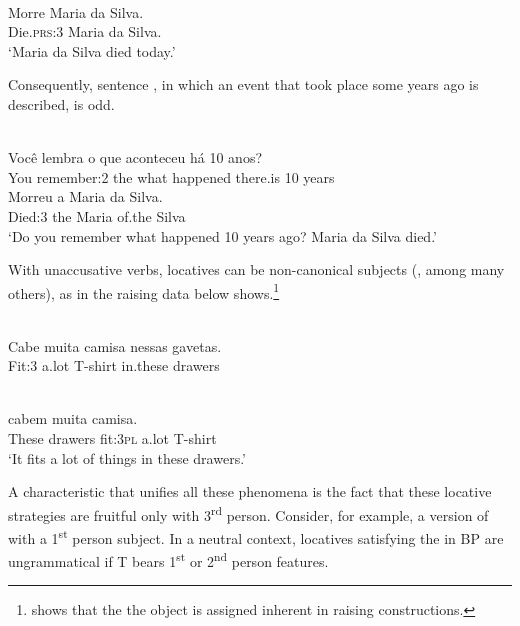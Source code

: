 \documentclass[output=paper]{LSP/langsci}
\begin{document}
\ea\label{ex:24.alexiadou}
\\
\gll Morre Maria da Silva.\\
 Die.\textsc{prs}:3 Maria da Silva.\\
\glt ‘Maria da Silva died today.’
\z

Consequently, sentence , in which an event that took place some years ago is described, is odd.


\ea\label{ex:25.alexiadou}
\\
\gll {} Você lembra o que aconteceu há 10 anos?\\
 {} You remember:2 the what happened there.is 10 years\\

\gll {\upshape *}  Morreu a Maria da Silva.\\
     {} Died:3 the Maria of.the Silva\\

\glt ‘Do you remember what happened 10 years ago? Maria da Silva died.’
\z


With unaccusative verbs, locatives can be non-canonical subjects (\citealt{Pontes1987,Galves2001,Lunguinho2006,Rodrigues2010}, among many others), as in the  raising data below shows.\footnote{\citet{Nunes2015} shows that the the object is assigned inherent  in  raising constructions.}


\ea\label{ex:26.alexiadou}
\\
\gll Cabe muita camisa nessas gavetas.\\
 Fit:3 a.lot T-shirt in.these drawers\\
\glt
\z

\ea\label{ex:27.alexiadou}
\\
 cabem muita camisa.\\
 These drawers fit:3\textsc{pl} a.lot T-shirt\\
\glt ‘It fits a lot of things in these drawers.’
\z


A characteristic that unifies all these phenomena is the fact that these locative strategies are fruitful only with 3\textsuperscript{rd} person. Consider, for example, a version of  with a 1\textsuperscript{st} person subject. In a neutral context, locatives satisfying the  in BP are ungrammatical if T bears 1\textsuperscript{st} or 2\textsuperscript{nd} person features.
\end{document}
